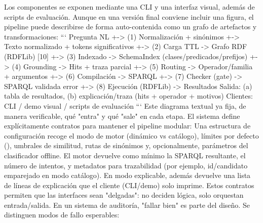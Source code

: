 {}Los componentes se exponen mediante una CLI y una interfaz visual, además de scripts de evaluación.\markdownRendererInterblockSeparator
{}\markdownRendererInterblockSeparator
{}Aunque en una versión final conviene incluir una figura, el pipeline puede describirse de forma auto-contenida como un grafo de artefactos y transformaciones:\markdownRendererInterblockSeparator
{}``` Pregunta NL +-> (1) Normalización + sinónimos +-> Texto normalizado + tokens significativos +-> (2) Carga TTL -> Grafo RDF (RDFLib) [10] \markdownRendererPipe{} +-> (3) Indexado -> SchemaIndex (clases/predicados/prefijos) +-> (4) Grounding -> Hits + traza parcial +-> (5) Routing -> Operador/familia + argumentos +-> (6) Compilación -> SPARQL +-> (7) Checker (gate) -> SPARQL validada \markdownRendererPipe{} error +-> (8) Ejecución (RDFLib) -> Resultados\markdownRendererInterblockSeparator
{}Salida: (a) tabla de resultados, (b) explicación/traza (hits + operador + motivos) Clientes: CLI / demo visual / scripts de evaluación ```\markdownRendererInterblockSeparator
{}Este diagrama textual ya fija, de manera verificable, qué "entra" y qué "sale" en cada etapa.\markdownRendererInterblockSeparator
{}\markdownRendererInterblockSeparator
{}El sistema define explícitamente contratos para mantener el pipeline modular:\markdownRendererInterblockSeparator
{}\markdownRendererUlBeginTight
\markdownRendererUlItem {} Una estructura de configuración recoge el modo de motor (dinámico vs catálogo), límites por defecto (), umbrales de similitud, rutas de sinónimos y, opcionalmente, parámetros del clasificador offline.\markdownRendererUlItemEnd 
\markdownRendererUlItem {} El motor devuelve como mínimo la SPARQL resultante, el número de intentos, y metadatos para trazabilidad (por ejemplo, id/candidato emparejado en modo catálogo). En modo explicable, además devuelve una lista de líneas de explicación que el cliente (CLI/demo) solo imprime.\markdownRendererUlItemEnd 
\markdownRendererUlEndTight \markdownRendererInterblockSeparator
{}Estos contratos permiten que las interfaces sean "delgadas": no deciden lógica, solo orquestan entrada/salida.\markdownRendererInterblockSeparator
{}\markdownRendererInterblockSeparator
{}En un sistema de auditoría, "fallar bien" es parte del diseño. Se distinguen modos de fallo esperables:\markdownRendererInterblockSeparator
